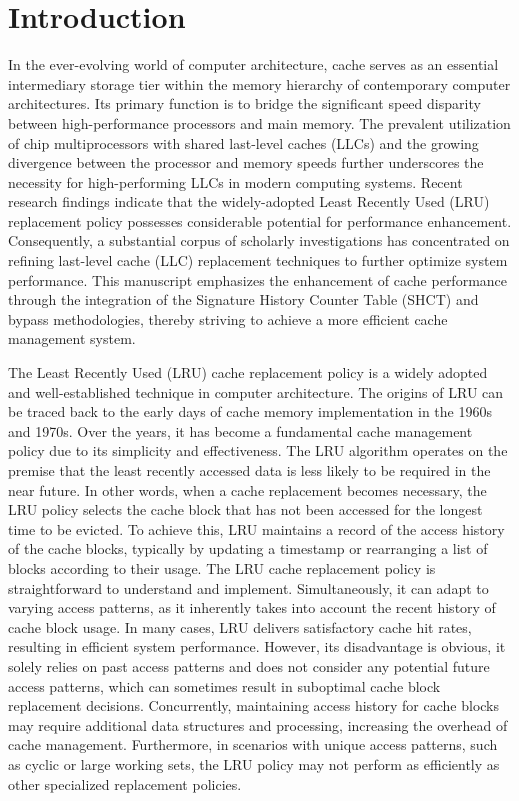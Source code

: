 
\section{Introduction}
In the ever-evolving world of computer architecture, cache serves as an essential intermediary storage tier within the memory hierarchy of contemporary computer architectures. Its primary function is to bridge the significant speed disparity between high-performance processors and main memory. The prevalent utilization of chip multiprocessors with shared last-level caches (LLCs) and the growing divergence between the processor and memory speeds further underscores the necessity for high-performing LLCs in modern computing systems\cite{Wu2011}. Recent research findings indicate that the widely-adopted Least Recently Used (LRU) replacement policy possesses considerable potential for performance enhancement. Consequently, a substantial corpus of scholarly investigations has concentrated on refining last-level cache (LLC) replacement techniques to further optimize system performance\cite{Gao2010,Seznec2010}. This manuscript emphasizes the enhancement of cache performance through the integration of the Signature History Counter Table (SHCT) and bypass methodologies, thereby striving to achieve a more efficient cache management system.\par
The Least Recently Used (LRU) cache replacement policy is a widely adopted and well-established technique in computer architecture. The origins of LRU can be traced back to the early days of cache memory implementation in the 1960s and 1970s. Over the years, it has become a fundamental cache management policy due to its simplicity and effectiveness. The LRU algorithm operates on the premise that the least recently accessed data is less likely to be required in the near future. In other words, when a cache replacement becomes necessary, the LRU policy selects the cache block that has not been accessed for the longest time to be evicted. To achieve this, LRU maintains a record of the access history of the cache blocks, typically by updating a timestamp or rearranging a list of blocks according to their usage. The LRU cache replacement policy is straightforward to understand and implement. Simultaneously, it can adapt to varying access patterns, as it inherently takes into account the recent history of cache block usage. In many cases, LRU delivers satisfactory cache hit rates, resulting in efficient system performance. However, its disadvantage is obvious, it solely relies on past access patterns and does not consider any potential future access patterns, which can sometimes result in suboptimal cache block replacement decisions. Concurrently, maintaining access history for cache blocks may require additional data structures and processing, increasing the overhead of cache management. Furthermore, in scenarios with unique access patterns, such as cyclic or large working sets, the LRU policy may not perform as efficiently as other specialized replacement policies\cite{Gao2010,Seznec2010,Khan2010,Daniel2010,Kharbutli2008,Qureshi2007,santh2007,C2010,Sigarch2009}.\par
